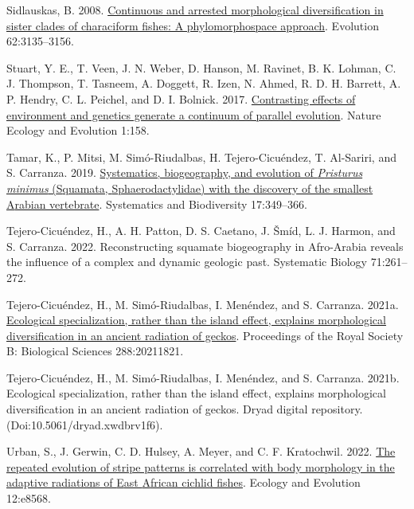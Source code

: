 \documentclass[
  11pt,
]{article}
\newlength{\cslhangindent}
\newlength{\cslentryspacingunit} %
\newenvironment{CSLReferences}[2] %
 {%
  \setlength{\parindent}{0pt}
  \ifodd #1
  \let\oldpar\par
  \def\par{\hangindent=\cslhangindent\oldpar}
  \fi
  \setlength{\parskip}{#2\cslentryspacingunit}
 }%
 {}
\begin{document}
\begin{CSLReferences}{1}{0}
\leavevmode{}%
Sidlauskas, B. 2008.
\href{https://doi.org/10.1111/j.1558-5646.2008.00519.x}{Continuous and
arrested morphological diversification in sister clades of characiform
fishes: A phylomorphospace approach}. Evolution 62:3135--3156.

\leavevmode{}%
Stuart, Y. E., T. Veen, J. N. Weber, D. Hanson, M. Ravinet, B. K.
Lohman, C. J. Thompson, T. Tasneem, A. Doggett, R. Izen, N. Ahmed, R. D.
H. Barrett, A. P. Hendry, C. L. Peichel, and D. I. Bolnick. 2017.
\href{https://doi.org/10.1038/s41559-017-0158}{Contrasting effects of
environment and genetics generate a continuum of parallel evolution}.
Nature Ecology and Evolution 1:158.

\leavevmode{}%
Tamar, K., P. Mitsi, M. Simó-Riudalbas, H. Tejero-Cicuéndez, T.
Al-Sariri, and S. Carranza. 2019.
\href{https://doi.org/10.1080/14772000.2019.1614694}{Systematics,
biogeography, and evolution of \emph{{P}risturus minimus} ({S}quamata,
{S}phaerodactylidae) with the discovery of the smallest {A}rabian
vertebrate}. Systematics and Biodiversity 17:349--366.

\leavevmode{}%
Tejero-Cicuéndez, H., A. H. Patton, D. S. Caetano, J. Šmíd, L. J.
Harmon, and S. Carranza. 2022. Reconstructing squamate biogeography in
{A}fro-{A}rabia reveals the influence of a complex and dynamic geologic
past. Systematic Biology 71:261--272.

\leavevmode{}%
Tejero-Cicuéndez, H., M. Simó-Riudalbas, I. Menéndez, and S. Carranza.
2021a. \href{https://doi.org/10.1098/rspb.2021.1821}{Ecological
specialization, rather than the island effect, explains morphological
diversification in an ancient radiation of geckos}. Proceedings of the
Royal Society B: Biological Sciences 288:20211821.

\leavevmode{}%
Tejero-Cicuéndez, H., M. Simó-Riudalbas, I. Menéndez, and S. Carranza.
2021b. Ecological specialization, rather than the island effect,
explains morphological diversification in an ancient radiation of
geckos. Dryad digital repository. (Doi:10.5061/dryad.xwdbrv1f6).

\leavevmode{}%
Urban, S., J. Gerwin, C. D. Hulsey, A. Meyer, and C. F. Kratochwil.
2022. \href{https://doi.org/10.1002/ece3.8568}{The repeated evolution of
stripe patterns is correlated with body morphology in the adaptive
radiations of {E}ast {A}frican cichlid fishes}. Ecology and Evolution
12:e8568.


\end{CSLReferences}
\end{document}
